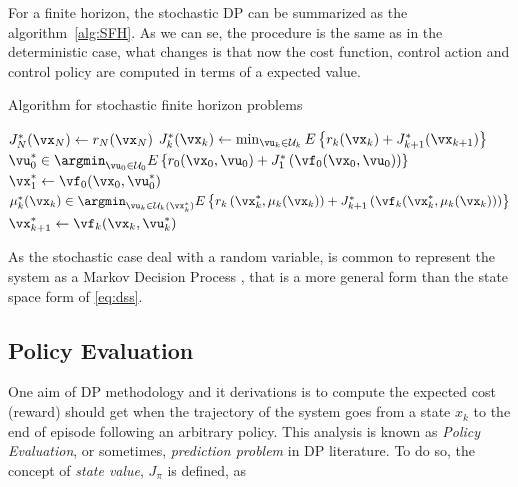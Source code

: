 For a finite horizon, the stochastic DP can be summarized as the algorithm~\ref{alg:SFH}. As we can se, the procedure is the same as in the deterministic case, what changes is that now the cost function, control action and control policy are computed in terms of a expected value.

\begin{algorithm}%
  \caption{Algorithm for stochastic finite horizon problems}\label{alg:SFH}

  $J^*_N(\vx_N) \gets r_N(\vx_N)$
    {
      $J^*_k(\vx_k) \gets \min_{\vu_k \in \mathcal{U}_k} E\left\{ r_k(\vx_k) + J^*_{k+1}(\vx_{k+1})\right\}$
   }
  $\vu_0^* \in \argmin_{\vu_0 \in \mathcal{U}_0} E\left\{ r_0(\vx_0,\vu_0) + J_1^*\left(\vf_0(\vx_0,\vu_0)\right) \right\}$ \\
  $\vx_1^* \gets \vf_0(\vx_0,\vu_0^*)$ \\
  {
    $\mu_k^*(\vx_k) \in \argmin_{\vu_k \in \mathcal{U}_k(\vx_k^*)} E\left\{ r_k\left(\vx_k^*,\mu_k(\vx_k)\right) + J_{k+1}^*\left(\vf_k(\vx_k^*,\mu_k(\vx_k))\right) \right\}$ \\
    $\vx_{k+1}^* \gets \vf_k(\vx_k,\vu_k^*)$
  }
\end{algorithm}%

As the stochastic case deal with a random variable, is common to represent the system as a Markov Decision Process \citep{sutton2018}, that is a more general form than the state space form of \eqref{eq:dss}.


\subsection{Policy Evaluation}
\label{sec:PE}


One aim of DP methodology and it derivations is to compute the expected cost (reward) should get when the trajectory of the system goes from a state $ x_k$ to the end of episode following an arbitrary policy. This analysis is known as \textit{Policy Evaluation}, or sometimes, \textit{prediction problem} in DP literature. To do so, the concept of \textit{state value}, $J_\pi$ is defined, as

